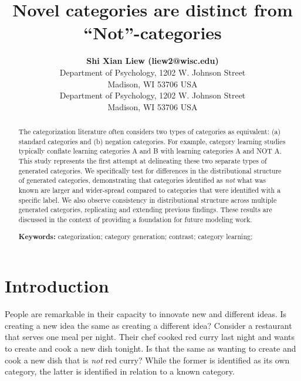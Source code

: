 \documentclass[10pt,letterpaper]{article}
\title{Novel categories are distinct from ``Not''-categories}
\author{{\large \bf Shi Xian Liew (liew2@wisc.edu)} \\
  Department of Psychology, 1202 W. Johnson Street \\
  Madison, WI 53706 USA
  \AND {\large \bf Joseph L. Austerweil (austerweil@wisc.edu)} \\
  Department of Psychology, 1202 W. Johnson Street \\
  Madison, WI 53706 USA}
\begin{document}
\maketitle


\begin{abstract}

  The categorization literature often considers two types of categories as equivalent: (a) standard categories and (b)
  negation categories. For example, category learning studies typically conflate learning categories A and B with
  learning categories A and NOT A. This study represents the first attempt at delineating these two separate types of
  generated categories. We specifically test for differences in the distributional structure of generated categories,
  demonstrating that categories identified as \emph{not} what was known are larger and wider-spread compared to
  categories that were identified with a specific label. We also observe consistency in distributional structure across
  multiple generated categories, replicating and extending previous findings. These results are discussed in the context
  of providing a foundation for future modeling work.

\textbf{Keywords:} 
categorization; category generation; contrast; category learning; 
\end{abstract}


\section{Introduction}

People are remarkable in their capacity to innovate new and different ideas. Is creating a new idea the same as creating
a different idea? Consider a restaurant that serves one meal per night. Their chef cooked red curry last night and wants
to create and cook a new dish tonight. Is that the same as wanting to create and cook a new dish that is {\em not} red
curry? While the former is identified as its own category, the latter is identified in relation to a known category.
\end{document}
